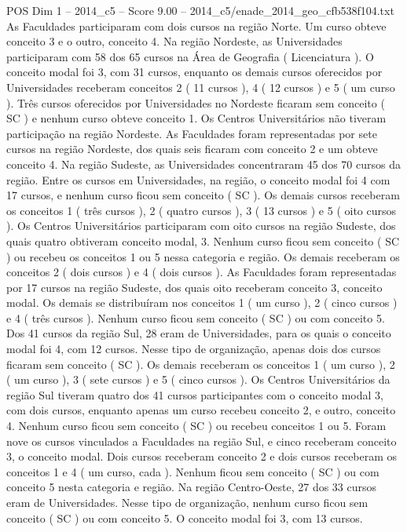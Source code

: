 \begin{textsample}{POS Dim 1 – 2014\_c5 – Score 9.00 – 2014\_c5/enade\_2014\_geo\_cfb538f104.txt}
As Faculdades participaram com dois cursos na região Norte.
Um curso obteve conceito 3 e o outro, conceito 4.
Na região Nordeste, as Universidades participaram com 58 dos 65 cursos na Área de Geografia ( Licenciatura ).
O conceito modal foi 3, com 31 cursos, enquanto os demais cursos oferecidos por Universidades receberam conceitos 2 ( 11 cursos ), 4 ( 12 cursos ) e 5 ( um curso ).
Três cursos oferecidos por Universidades no Nordeste ficaram sem conceito ( SC ) e nenhum curso obteve conceito 1.
Os Centros Universitários não tiveram participação na região Nordeste.
As Faculdades foram representadas por sete cursos na região Nordeste, dos quais seis ficaram com conceito 2 e um obteve conceito 4.
Na região Sudeste, as Universidades concentraram 45 dos 70 cursos da região.
Entre os cursos em Universidades, na região, o conceito modal foi 4 com 17 cursos, e nenhum curso ficou sem conceito ( SC ).
Os demais cursos receberam os conceitos 1 ( três cursos ), 2 ( quatro cursos ), 3 ( 13 cursos ) e 5 ( oito cursos ).
Os Centros Universitários participaram com oito cursos na região Sudeste, dos quais quatro obtiveram conceito modal, 3.
Nenhum curso ficou sem conceito ( SC ) ou recebeu os conceitos 1 ou 5 nessa categoria e região.
Os demais receberam os conceitos 2 ( dois cursos ) e 4 ( dois cursos ).
As Faculdades foram representadas por 17 cursos na região Sudeste, dos quais oito receberam conceito 3, conceito modal.
Os demais se distribuíram nos conceitos 1 ( um curso ), 2 ( cinco cursos ) e 4 ( três cursos ).
Nenhum curso ficou sem conceito ( SC ) ou com conceito 5.
Dos 41 cursos da região Sul, 28 eram de Universidades, para os quais o conceito modal foi 4, com 12 cursos.
Nesse tipo de organização, apenas dois dos cursos ficaram sem conceito ( SC ).
Os demais receberam os conceitos 1 ( um curso ), 2 ( um curso ), 3 ( sete cursos ) e 5 ( cinco cursos ).
Os Centros Universitários da região Sul tiveram quatro dos 41 cursos participantes com o conceito modal 3, com dois cursos, enquanto apenas um curso recebeu conceito 2, e outro, conceito 4.
Nenhum curso ficou sem conceito ( SC ) ou recebeu conceitos 1 ou 5.
Foram nove os cursos vinculados a Faculdades na região Sul, e cinco receberam conceito 3, o conceito modal.
Dois cursos receberam conceito 2 e dois cursos receberam os conceitos 1 e 4 ( um curso, cada ).
Nenhum ficou sem conceito ( SC ) ou com conceito 5 nesta categoria e região.
Na região Centro-Oeste, 27 dos 33 cursos eram de Universidades.
Nesse tipo de organização, nenhum curso ficou sem conceito ( SC ) ou com conceito 5.
O conceito modal foi 3, com 13 cursos.

\end{textsample}
